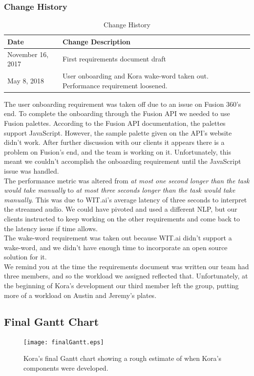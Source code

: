 \documentclass[onecolumn, draftclsnofoot,10pt, compsoc]{IEEEtran}
\newcommand{\newpara}{\\[0.1in]}
\begin{document}
		\subsubsection{Change History}
		\begin{table}[H]
			\centering
			\caption{Change History}
			\label{my-label}
			\begin{tabular}{|l|l|}
				\hline
				\textbf{Date}     & \textbf{Change Description}   \\ \hline
				November 16, 2017 & {First requirements document draft} \\ \hline
				May 8, 2018 & {User onboarding and Kora wake-word taken out. Performance requirement loosened.} \\ \hline
			\end{tabular}
		\end{table}

		The user onboarding requirement was taken off due to an issue on Fusion 360's end.
		To complete the onboarding through the Fusion API we needed to use Fusion palettes.
		According to the Fusion API documentation, the palettes support JavaScript. However, the sample palette given on the API's website didn't work.
		After further discussion with our clients it appears there is a problem on Fusion's end, and the team is working on it.
		Unfortunately, this meant we couldn't accomplish the onboarding requirement until the JavaScript issue was handled.
		\newpara
		The performance metric was altered from \textit{at most one second longer than the task would take manually} to \textit{at most three seconds longer than the task would take manually}.
		This was due to WIT.ai's average latency of three seconds to interpret the streamed audio.
		We could have pivoted and used a different NLP, but our clients instructed to keep working on the other requirements and come back to the latency issue if time allows.
		\newpara
		The wake-word requirement was taken out because WIT.ai didn't support a wake-word, and we didn't have enough time to incorporate an open source solution for it.
		\newpara
		We remind you at the time the requirements document was written our team had three members, and so the workload we assigned reflected that. Unfortunately, at the beginning of Kora's development our third member left the group, putting more of a workload on Austin and Jeremy's plates.

	\subsection{Final Gantt Chart}
		\begin{figure}[H]
			\texttt{[image: finalGantt.eps]}
			\centering
			\caption{Kora's final Gantt chart showing a rough estimate of when Kora's components were developed.}
		\end{figure}
\end{document}
